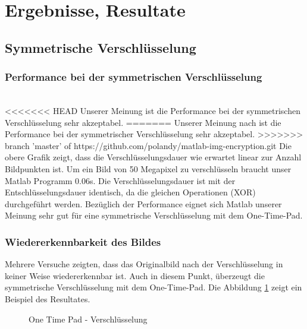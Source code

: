 \documentclass[paper=a4,fontsize=12pt]{scrartcl}
\begin{document}
\newpage
\section{Ergebnisse, Resultate} \label{results} 

\subsection{Symmetrische Verschlüsselung}
\subsubsection{Performance bei der symmetrischen Verschlüsselung}
 \\
<<<<<<< HEAD
Unserer Meinung ist die Performance bei der symmetrischen Verschlüsselung sehr akzeptabel.
=======
Unserer Meinung nach ist die Performance bei der symmetrischer Verschlüsselung sehr akzeptabel.
>>>>>>> branch 'master' of https://github.com/polandy/matlab-img-encryption.git
Die obere Grafik zeigt, dass die Verschlüsselungsdauer wie erwartet linear zur Anzahl Bildpunkten ist.
Um ein Bild von 50 Megapixel zu verschlüsseln braucht unser Matlab Programm 0.06s.
Die Verschlüsselungsdauer ist mit der Entschlüsselungsdauer identisch, da die gleichen Operationen (XOR) durchgeführt werden.
Bezüglich der Performance eignet sich Matlab unserer Meinung sehr gut für eine symmetrische Verschlüsselung mit dem One-Time-Pad.

\subsubsection{Wiedererkennbarkeit des Bildes}
Mehrere Versuche zeigten, dass das Originalbild nach der Verschlüsselung in keiner Weise wiedererkennbar ist.
Auch in diesem Punkt, überzeugt die symmetrische Verschlüsselung mit dem One-Time-Pad.
Die Abbildung \ref{sym-enc-result} zeigt ein Beispiel des Resultates.
\begin{figure}[H] 
	\centering
	\caption[One Time Pad - Verschlüsselung]{One Time Pad - Verschlüsselung}  
	\label{sym-enc-result} 
\end{figure}
\end{document}
